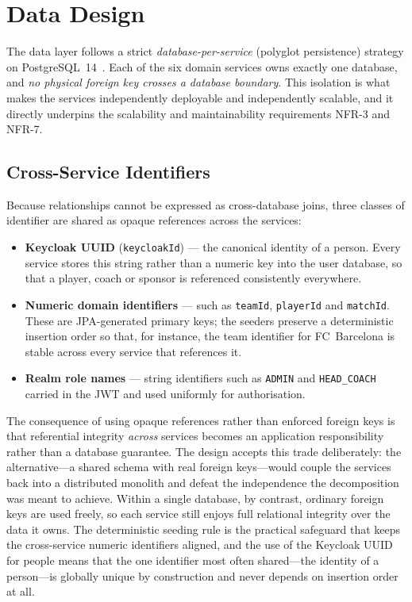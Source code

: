 \section{Data Design}
\label{sec:data-design}

The data layer follows a strict \emph{database-per-service} (polyglot persistence)
strategy on PostgreSQL~14~\cite{postgres}. Each of the six domain services owns exactly
one database, and \emph{no physical foreign key crosses a database boundary}. This
isolation is what makes the services independently deployable and independently
scalable, and it directly underpins the scalability and maintainability requirements
NFR-3 and NFR-7.

\subsection{Cross-Service Identifiers}

Because relationships cannot be expressed as cross-database joins, three classes of
identifier are shared as opaque references across the services:

\begin{itemize}
  \item \textbf{Keycloak UUID} (\texttt{keycloakId}) --- the canonical identity of a
  person. Every service stores this string rather than a numeric key into the user
  database, so that a player, coach or sponsor is referenced consistently everywhere.
  \item \textbf{Numeric domain identifiers} --- such as \texttt{teamId},
  \texttt{playerId} and \texttt{matchId}. These are JPA-generated primary keys; the
  seeders preserve a deterministic insertion order so that, for instance, the team
  identifier for FC~Barcelona is stable across every service that references it.
  \item \textbf{Realm role names} --- string identifiers such as \texttt{ADMIN} and
  \texttt{HEAD\_COACH} carried in the JWT and used uniformly for authorisation.
\end{itemize}

The consequence of using opaque references rather than enforced foreign keys is that
referential integrity \emph{across} services becomes an application responsibility
rather than a database guarantee. The design accepts this trade deliberately: the
alternative---a shared schema with real foreign keys---would couple the services back
into a distributed monolith and defeat the independence the decomposition was meant to
achieve. Within a single database, by contrast, ordinary foreign keys are used freely,
so each service still enjoys full relational integrity over the data it owns. The
deterministic seeding rule is the practical safeguard that keeps the cross-service
numeric identifiers aligned, and the use of the Keycloak UUID for people means that
the one identifier most often shared---the identity of a person---is globally unique by
construction and never depends on insertion order at all.


